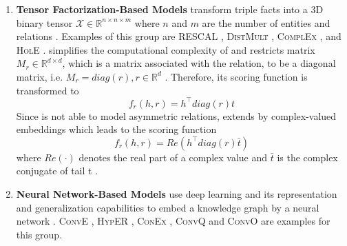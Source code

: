 \begin{enumerate}
    \item 
    \textbf{Tensor Factorization-Based Models} transform triple facts into a 3D binary tensor $\mathcal{X} \in \mathbb{R}^{n \times n \times m}$ where $n$ and $m$ are the number of entities and relations \cite{electronics9050750}.
    Examples of this group are \textsc{RESCAL} \cite{RESCAL}, \textsc{DistMult} \cite{DistMult}, \textsc{ComplEx} \cite{ComplEx}, and \textsc{HolE} \cite{HolE}.
    \distmult simplifies the computational complexity of \rescal and restricts matrix $M_r \in \mathbb{R}^{d \times d}$, which is a matrix associated with the relation, to be a diagonal matrix, i.e. $M_r = diag(r), r \in \mathbb{R}^d$ \cite{electronics9050750}. 
    Therefore, its scoring function is transformed to
    \begin{equation}
        f_r(h,r) = h^{\top}diag(r)t\label{eq:distmultscoringfunction}
    \end{equation}
    Since \distmult is not able to model asymmetric relations, \complex \cite{ComplEx} extends \distmult by complex-valued embeddings \cite{electronics9050750} which leads to the scoring function
    \begin{equation}
        f_r(h,r) = Re(h^{\top}diag(r)\bar{t})
        \label{eq:complexscoringfunction}
    \end{equation}
    where $Re(\cdot)$ denotes the real part of a complex value and $\bar{t}$ is the complex conjugate of tail t \cite{electronics9050750}.
    
    \item 
    \textbf{Neural Network-Based Models} use deep learning and its representation and generalization capabilities to embed a knowledge graph by a neural network \cite{electronics9050750}.
    \textsc{ConvE} \cite{ConvE}, \textsc{HypER} \cite{HypER}, \textsc{ConEx} \cite{ConEx}, \textsc{ConvQ} and  \textsc{ConvO} \cite{demir2021convolutional} are examples for this group.
    
\end{enumerate}